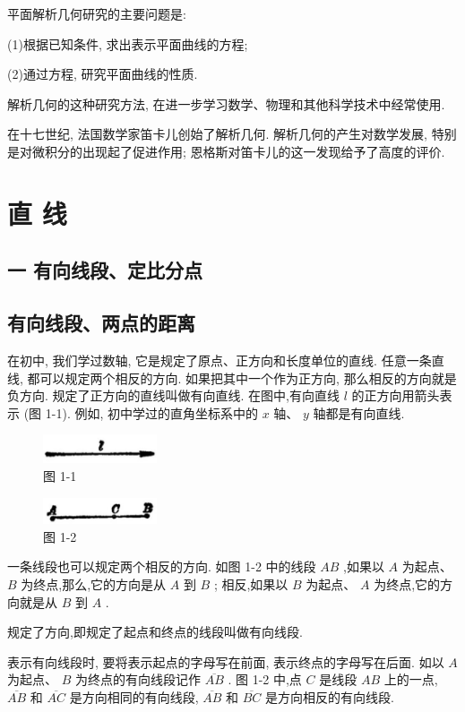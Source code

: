 \documentclass[lang=cn,newtx,10pt,scheme=chinese]{elegantbook}
\begin{document}
平面解析几何研究的主要问题是:

(1)根据已知条件, 求出表示平面曲线的方程;

(2)通过方程, 研究平面曲线的性质.

解析几何的这种研究方法, 在进一步学习数学、物理和其他科学技术中经常使用.

在十七世纪, 法国数学家笛卡儿创始了解析几何. 解析几何的产生对数学发展, 特别是对微积分的出现起了促进作用; 恩格斯对笛卡儿的这一发现给予了高度的评价.

\chapter{直 线}

\section*{一 \text{ }有向线段、定比分点}

\section{有向线段、两点的距离}

在初中, 我们学过数轴, 它是规定了原点、正方向和长度单位的直线. 任意一条直线, 都可以规定两个相反的方向. 如果把其中一个作为正方向, 那么相反的方向就是负方向. 规定了正方向的直线叫做有向直线. 在图中,有向直线 \(l\) 的正方向用箭头表示 (图 1-1). 例如, 初中学过的直角坐标系中的 \(x\) 轴、 \(y\) 轴都是有向直线.

\begin{figure}[h]
  \centering
  \includegraphics[max width=0.3\textwidth]{images/01912cc2-ffb6-728e-9ae7-b113ff05c64b_7_968321.jpg}
  \caption{图 1-1}
\end{figure}



\begin{figure}[h]
  \centering
  \includegraphics[max width=0.3\textwidth]{images/01912cc2-ffb6-728e-9ae7-b113ff05c64b_7_264987.jpg}
  \caption{图 1-2}
\end{figure}



一条线段也可以规定两个相反的方向. 如图 1-2 中的线段 \({AB}\) ,如果以 \(A\) 为起点、 \(B\) 为终点,那么,它的方向是从 \(A\) 到 \(B\) ; 相反,如果以 \(B\) 为起点、 \(A\) 为终点,它的方向就是从 \(B\) 到 \(A\) . 
\begin{definition}[有向线段] 
	规定了方向,即规定了起点和终点的线段叫做有向线段.
\end{definition}
 表示有向线段时, 要将表示起点的字母写在前面, 表示终点的字母写在后面. 如以 \(A\) 为起点、 \(B\) 为终点的有向线段记作 \(\overline{AB}\) . 图 1-2 中,点 \(C\) 是线段 \({AB}\) 上的一点, \(\overline{AB}\) 和 \(\overline{AC}\) 是方向相同的有向线段, \(\overline{AB}\) 和 \(\overline{BC}\) 是方向相反的有向线段.
\end{document}
